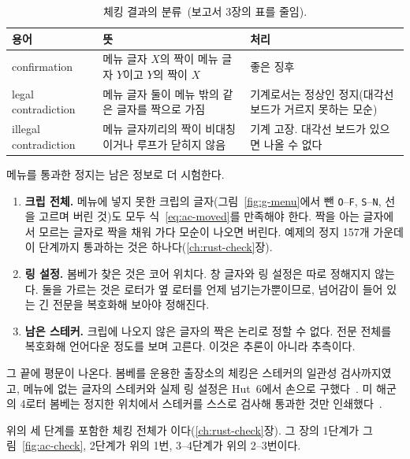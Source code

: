 \begin{table}[ht]
\centering
\caption{체킹 결과의 분류~\cite[12--16, 49--50]{us6812report1944}(보고서 3장의 표를 줄임).}
\label{tab:ac-verdicts}
\small
\begin{tabularx}{\linewidth}{l>{\raggedright\arraybackslash}X>{\raggedright\arraybackslash}X}
\toprule
용어 & 뜻 & 처리 \\
\midrule
confirmation & 메뉴 글자 $X$의 짝이 메뉴 글자 $Y$이고 $Y$의 짝이 $X$ & 좋은 징후 \\ \addlinespace
legal contradiction & 메뉴 글자 둘이 메뉴 밖의 같은 글자를 짝으로 가짐 & 기계로서는 정상인 정지(대각선 보드가 거르지 못하는 모순) \\ \addlinespace
illegal contradiction & 메뉴 글자끼리의 짝이 비대칭이거나 루프가 닫히지 않음 & 기계 고장. 대각선 보드가 있으면 나올 수 없다 \\
\bottomrule
\end{tabularx}
\end{table}

메뉴를 통과한 정지는 남은 정보로 더 시험한다.

\begin{enumerate}
\item \textbf{크립 전체.} 메뉴에 넣지 못한 크립의 글자(그림~\ref{fig:g-menu}에서 뺀 \texttt{O}--\texttt{F},
\texttt{S}--\texttt{N}, 선을 고르며 버린 것)도 모두 식~\eqref{eq:ac-moved}를 만족해야 한다. 짝을 아는 글자에서 모르는
글자로 짝을 채워 가다 모순이 나오면 버린다. 예제의 정지 157개 가운데 이 단계까지 통과하는 것은 하나다(\ref{ch:rust-check}장).
\item \textbf{링 설정.} 봄베가 찾은 것은 코어 위치다. 창 글자와 링 설정은 따로 정해지지 않는다. 둘을 가르는 것은 로터가
옆 로터를 언제 넘기는가뿐이므로, 넘어감이 들어 있는 긴 전문을 복호화해 보아야 정해진다.
\item \textbf{남은 스테커.} 크립에 나오지 않은 글자의 짝은 논리로 정할 수 없다. 전문 전체를 복호화해 언어다운 정도를
보며 고른다. 이것은 추론이 아니라 추측이다.
\end{enumerate}

그 끝에 평문이 나온다. 봄베를 운용한 출장소의 체킹은 스테커의 일관성 검사까지였고, 메뉴에 없는 글자의 스테커와 실제 링
설정은 Hut~6에서 손으로 구했다~\cite{ellsbury1998bombe,carter2010bombe}. 미 해군의 4로터 봄베는 정지한 위치에서 스테커를
스스로 검사해 통과한 것만 인쇄했다~\cite{ekhall-hallenberg2018}.

\Ours 위의 세 단계를 포함한 체킹 전체가 이다(\ref{ch:rust-check}장). 그 장의 1단계가
그림~\ref{fig:ac-check}, 2단계가 위의 1번, 3--4단계가 위의 2--3번이다.

